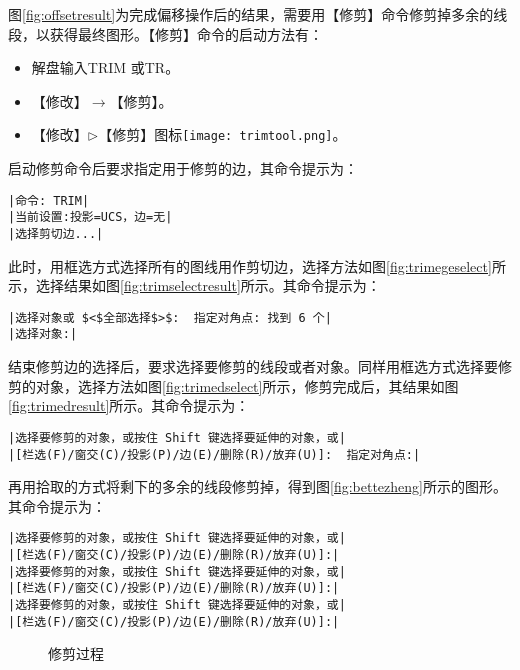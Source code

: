 \begin{procedure}
图\ref{fig:offsetresult}为完成偏移操作后的结果，需要用【修剪】命令修剪掉多余的线段，以获得最终图形。【修剪】命令的启动方法有：
\begin{itemize}
\item 解盘输入TRIM 或TR。
\item 【修改】$\rightarrow$【修剪】。
\item 【修改】$\triangleright$【修剪】图标\texttt{[image: trimtool.png]}。
\end{itemize}
启动修剪命令后要求指定用于修剪的边，其命令提示为：
\begin{lstlisting}
|命令: TRIM|
|当前设置:投影=UCS，边=无|
|选择剪切边...|
\end{lstlisting}
此时，用框选方式选择所有的图线用作剪切边，选择方法如图\ref{fig:trimegeselect}所示，选择结果如图\ref{fig:trimselectresult}所示。其命令提示为：
\begin{lstlisting}
|选择对象或 $<$全部选择$>$:  指定对角点: 找到 6 个|
|选择对象:|
\end{lstlisting}
结束修剪边的选择后，要求选择要修剪的线段或者对象。同样用框选方式选择要修剪的对象，选择方法如图\ref{fig:trimedselect}所示，修剪完成后，其结果如图\ref{fig:trimedresult}所示。其命令提示为：
\begin{lstlisting}
|选择要修剪的对象，或按住 Shift 键选择要延伸的对象，或|
|[栏选(F)/窗交(C)/投影(P)/边(E)/删除(R)/放弃(U)]:  指定对角点:|
\end{lstlisting}
再用拾取的方式将剩下的多余的线段修剪掉，得到图\ref{fig:bettezheng}所示的图形。其命令提示为：
\begin{lstlisting}
|选择要修剪的对象，或按住 Shift 键选择要延伸的对象，或|
|[栏选(F)/窗交(C)/投影(P)/边(E)/删除(R)/放弃(U)]:|
|选择要修剪的对象，或按住 Shift 键选择要延伸的对象，或|
|[栏选(F)/窗交(C)/投影(P)/边(E)/删除(R)/放弃(U)]:|
|选择要修剪的对象，或按住 Shift 键选择要延伸的对象，或|
|[栏选(F)/窗交(C)/投影(P)/边(E)/删除(R)/放弃(U)]:|
\end{lstlisting}
\begin{figure}[htbp]
\centering
{}\hspace{20pt}
\hspace{20pt}
\hspace{20pt}
\caption{修剪过程}
\end{figure}
\end{procedure}

